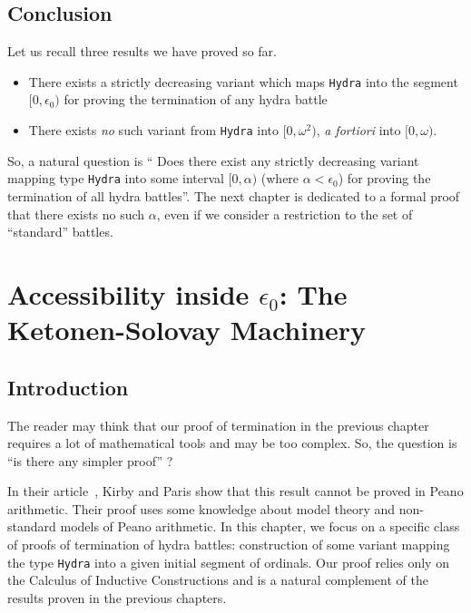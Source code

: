     
    \section*{Conclusion}

    Let us recall three results we have proved so far.
    \begin{itemize}
    \item There exists a strictly decreasing variant which maps \texttt{Hydra} into 
    the segment $[0,\epsilon_0)$ for proving the termination of any hydra battle
    \item There exists \emph{no} such variant from \texttt{Hydra} into 
    $[0,\omega^2)$, \emph{a fortiori} into $[0,\omega)$.
    \end{itemize}

    So, a  natural question is `` Does there exist any strictly decreasing variant mapping
    type \texttt{Hydra} into some interval $[0,\alpha)$ (where $\alpha <\epsilon_0$) for proving the termination of all hydra battles''. The next chapter is dedicated to a formal proof that there exists no such $\alpha$, even if we consider a restriction to the set of ``standard'' battles.













\chapter[The Ketonen-Solovay machinery]{Accessibility inside \texorpdfstring{$\epsilon_0$}{Epsilon0}: The Ketonen-Solovay Machinery\label{ks-chapter}}
\label{chap:ketonen}

\section{Introduction}
The reader may think that our proof of termination in the previous  chapter requires a lot of mathematical tools and may be too  complex. So, the question is ``is there  any  simpler proof'' ?

In their article~\cite{KP82}, Kirby and Paris show that this result cannot be proved in Peano arithmetic. Their proof uses some knowledge about model theory and non-standard models of Peano arithmetic. In this chapter, we focus on a specific class of proofs of termination of hydra battles: construction of some variant mapping the type \texttt{Hydra} into a given initial  segment of ordinals. Our proof relies only on the Calculus of Inductive Constructions and is a natural complement of the results proven in the previous chapters.

